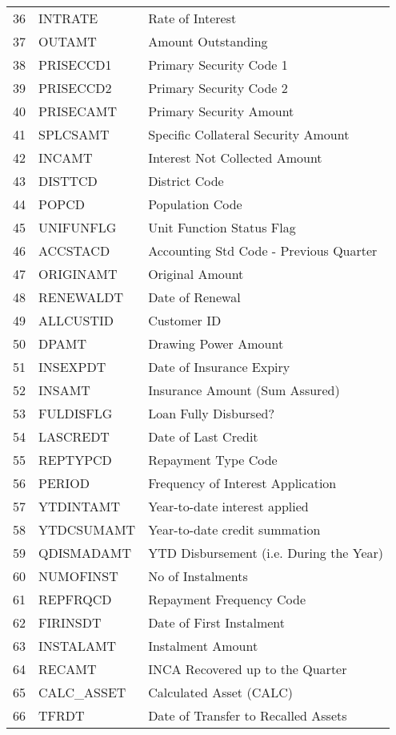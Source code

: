 \documentclass[a4paper]{article}
\begin{document}
\begin{longtable}{|c|l|p{8cm}|}
		36 & INTRATE & Rate of Interest \\
		37 & OUTAMT & Amount Outstanding \\
		38 & PRISECCD1 & Primary Security Code 1 \\
		39 & PRISECCD2 & Primary Security Code 2 \\
		40 & PRISECAMT & Primary Security Amount \\
		41 & SPLCSAMT & Specific Collateral Security Amount \\
		42 & INCAMT & Interest Not Collected Amount \\
		43 & DISTTCD & District Code \\
		44 & POPCD & Population Code \\
		45 & UNIFUNFLG & Unit Function Status Flag \\
		46 & ACCSTACD & Accounting Std Code - Previous Quarter \\
		47 & ORIGINAMT & Original Amount \\
		48 & RENEWALDT & Date of Renewal \\
		49 & ALLCUSTID & Customer ID \\
		50 & DPAMT & Drawing Power Amount \\
		51 & INSEXPDT & Date of Insurance Expiry \\
		52 & INSAMT & Insurance Amount (Sum Assured) \\
		53 & FULDISFLG & Loan Fully Disbursed? \\
		54 & LASCREDT & Date of Last Credit \\
		55 & REPTYPCD & Repayment Type Code \\
		56 & PERIOD & Frequency of Interest Application \\
		57 & YTDINTAMT & Year-to-date interest applied \\
		58 & YTDCSUMAMT & Year-to-date credit summation \\
		59 & QDISMADAMT & YTD Disbursement (i.e. During the Year) \\
		60 & NUMOFINST & No of Instalments \\
		61 & REPFRQCD & Repayment Frequency Code \\
		62 & FIRINSDT & Date of First Instalment \\
		63 & INSTALAMT & Instalment Amount \\
		64 & RECAMT & INCA Recovered up to the Quarter \\
		65 & CALC\_ASSET & Calculated Asset (CALC) \\
		66 & TFRDT & Date of Transfer to Recalled Assets \\

\end{longtable}
\end{document}
